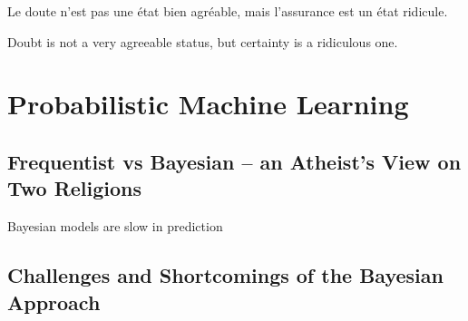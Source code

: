 
\begin{savequote}[8cm]
	\textlatin{Le doute n'est pas une état bien agréable, mais l'assurance est un état ridicule.}
	
	Doubt is not a very agreeable status, but certainty is a ridiculous one.
\end{savequote}


\chapter{Probabilistic Machine Learning}
\label{chp:bayes}






\section{Frequentist vs Bayesian -- an Atheist's View on Two Religions}
\label{sec:bayes:religions}

Bayesian models are slow in prediction


\section{Challenges and Shortcomings of the Bayesian Approach}
\label{sec:bayes:challenges}

